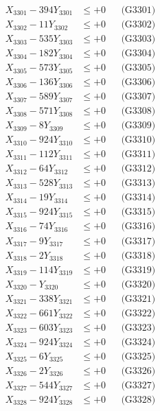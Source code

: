 \documentclass[a4paper,10pt]{article}
\begin{document}
{\begin{align}
\allowbreak
X_{3301} - 394Y_{3301} &\leq +0 && \text{(G3301)} \\
X_{3302} - 11Y_{3302} &\leq +0 && \text{(G3302)} \\
X_{3303} - 535Y_{3303} &\leq +0 && \text{(G3303)} \\
X_{3304} - 182Y_{3304} &\leq +0 && \text{(G3304)} \\
X_{3305} - 573Y_{3305} &\leq +0 && \text{(G3305)} \\
X_{3306} - 136Y_{3306} &\leq +0 && \text{(G3306)} \\
X_{3307} - 589Y_{3307} &\leq +0 && \text{(G3307)} \\
X_{3308} - 571Y_{3308} &\leq +0 && \text{(G3308)} \\
X_{3309} - 8Y_{3309} &\leq +0 && \text{(G3309)} \\
X_{3310} - 924Y_{3310} &\leq +0 && \text{(G3310)} \\
\allowbreak
X_{3311} - 112Y_{3311} &\leq +0 && \text{(G3311)} \\
X_{3312} - 64Y_{3312} &\leq +0 && \text{(G3312)} \\
X_{3313} - 528Y_{3313} &\leq +0 && \text{(G3313)} \\
X_{3314} - 19Y_{3314} &\leq +0 && \text{(G3314)} \\
X_{3315} - 924Y_{3315} &\leq +0 && \text{(G3315)} \\
X_{3316} - 74Y_{3316} &\leq +0 && \text{(G3316)} \\
X_{3317} - 9Y_{3317} &\leq +0 && \text{(G3317)} \\
X_{3318} - 2Y_{3318} &\leq +0 && \text{(G3318)} \\
X_{3319} - 114Y_{3319} &\leq +0 && \text{(G3319)} \\
X_{3320} - Y_{3320} &\leq +0 && \text{(G3320)} \\
\allowbreak
X_{3321} - 338Y_{3321} &\leq +0 && \text{(G3321)} \\
X_{3322} - 661Y_{3322} &\leq +0 && \text{(G3322)} \\
X_{3323} - 603Y_{3323} &\leq +0 && \text{(G3323)} \\
X_{3324} - 924Y_{3324} &\leq +0 && \text{(G3324)} \\
X_{3325} - 6Y_{3325} &\leq +0 && \text{(G3325)} \\
X_{3326} - 2Y_{3326} &\leq +0 && \text{(G3326)} \\
X_{3327} - 544Y_{3327} &\leq +0 && \text{(G3327)} \\
X_{3328} - 924Y_{3328} &\leq +0 && \text{(G3328)} \\

\end{align}}
\end{document}
